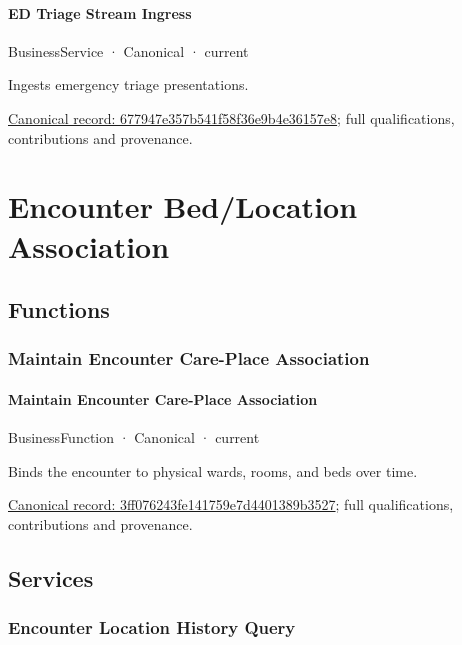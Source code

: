 \paragraph{ED Triage Stream Ingress}

\label{element:677947e357b541f58f36e9b4e36157e8}
{\small BusinessService · Canonical · current}\par

Ingests emergency triage presentations.


{\footnotesize \href{../../../../continuum/business/business-service/677947e357b541f58f36e9b4e36157e8.md}{Canonical record: 677947e357b541f58f36e9b4e36157e8}; full qualifications, contributions and provenance.}\par
\section{Encounter Bed/Location Association}

\subsection{Functions}

\subsubsection{Maintain Encounter Care-Place Association}

\paragraph{Maintain Encounter Care-Place Association}

\label{element:3ff076243fe141759e7d4401389b3527}
{\small BusinessFunction · Canonical · current}\par

Binds the encounter to physical wards, rooms, and beds over time.


{\footnotesize \href{../../../../continuum/business/business-function/3ff076243fe141759e7d4401389b3527.md}{Canonical record: 3ff076243fe141759e7d4401389b3527}; full qualifications, contributions and provenance.}\par
\subsection{Services}

\subsubsection{Encounter Location History Query}

